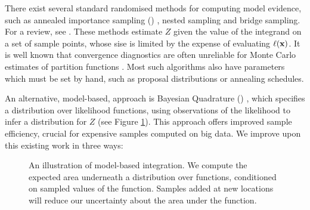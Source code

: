 \documentclass{article} %
\begin{document}

There exist several standard randomised methods for computing model evidence, such as annealed importance sampling () \cite{neal2001annealed}, nested sampling \cite{skilling2004nested} and bridge sampling.  For a review, see \cite{chen2000monte}.   These methods estimate $Z$ given the value of the integrand on a set of sample points, whose sise is limited by the expense of evaluating $\ell(\vlfv)$.  It is well known that convergence diagnostics are often unreliable for Monte Carlo estimates of partition functions  \cite{NealMC, brooks1998convergence, cowles1999possible}.  Most such algorithms also have parameters which must be set by hand, such as proposal distributions or annealing schedules.


An alternative, model-based, approach is Bayesian Quadrature () \cite{stanford1986bayesian, BZHermiteQuadrature, BZMonteCarlo}, which specifies a distribution over likelihood functions, using observations of the likelihood to infer a distribution for $Z$ (see Figure \ref{fig:model_based}). This approach offers improved sample efficiency, crucial for expensive samples computed on big data. We improve upon this existing work in three ways:

\begin{figure}
\centering
{}
\caption{An illustration of model-based integration.  We compute the expected area underneath a distribution over functions, conditioned on sampled values of the function.  Samples added at new locations will reduce our uncertainty about the area under the function.}
\label{fig:model_based}
\end{figure}
\end{document}

